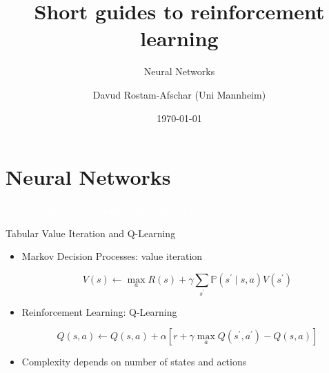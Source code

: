 \documentclass[11pt,table]{beamer}
\title[]{Short guides to reinforcement learning}
\subtitle[]{Neural Networks}
\author[D. Rostam-Afschar]{\textcolor{gray1}{Davud Rostam-Afschar (Uni Mannheim)}}
\date[]{\today}
\begin{document}
\begin{frame}[plain]
  \titlepage
\end{frame}


\section{Neural Networks}
{
\begin{frame}
\centering
\Huge
\textcolor{white}{How to deal with very large state-action spaces?}
\thispagestyle{empty}
\end{frame}
}



\begin{frame}{Tabular Value Iteration and Q-Learning}


  \begin{itemize}
      \item  Markov Decision Processes: value iteration 
      
      $$V(s) \leftarrow \max _{a} R(s)+\gamma \sum_{s^{\prime}} \mathbb{P}\left(s^{\prime} \mid s, a\right) V\left(s^{\prime}\right)$$

\item  Reinforcement Learning: Q-Learning

$$
Q(s, a) \leftarrow Q(s, a)+\alpha\left[r+\gamma \max _{a} Q\left(s^{\prime}, a^{\prime}\right)-Q(s, a)\right]
$$

\item  Complexity depends on number of states and actions 
  \end{itemize}  
\end{frame}
\end{document}
